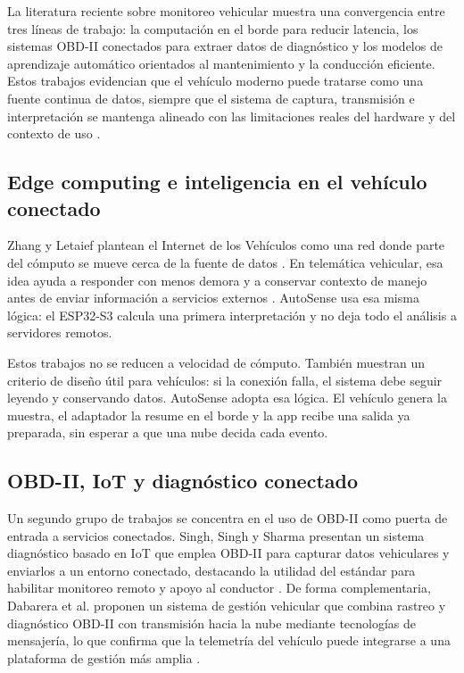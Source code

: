 \documentclass[12pt,letterpaper]{report}
\begin{document}
\label{sec:trabajos-relacionados}

La literatura reciente sobre monitoreo vehicular muestra una convergencia entre tres líneas de trabajo: la computación en el borde para reducir latencia, los sistemas OBD-II conectados para extraer datos de diagnóstico y los modelos de aprendizaje automático orientados al mantenimiento y la conducción eficiente. Estos trabajos evidencian que el vehículo moderno puede tratarse como una fuente continua de datos, siempre que el sistema de captura, transmisión e interpretación se mantenga alineado con las limitaciones reales del hardware y del contexto de uso \cite{zhang2020_iov_edge,selvaraj2023_advanced_telematics,kalalas2025_ai_driven_monitoring}.

\subsection{Edge computing e inteligencia en el vehículo conectado}

Zhang y Letaief plantean el Internet de los Vehículos como una red donde parte del cómputo se mueve cerca de la fuente de datos \cite{zhang2020_iov_edge}. En telemática vehicular, esa idea ayuda a responder con menos demora y a conservar contexto de manejo antes de enviar información a servicios externos \cite{selvaraj2023_advanced_telematics,kalalas2025_ai_driven_monitoring}. AutoSense usa esa misma lógica: el ESP32-S3 calcula una primera interpretación y no deja todo el análisis a servidores remotos.

Estos trabajos no se reducen a velocidad de cómputo. También muestran un criterio de diseño útil para vehículos: si la conexión falla, el sistema debe seguir leyendo y conservando datos. AutoSense adopta esa lógica. El vehículo genera la muestra, el adaptador la resume en el borde y la app recibe una salida ya preparada, sin esperar a que una nube decida cada evento.

\subsection{OBD-II, IoT y diagnóstico conectado}

Un segundo grupo de trabajos se concentra en el uso de OBD-II como puerta de entrada a servicios conectados. Singh, Singh y Sharma presentan un sistema diagnóstico basado en IoT que emplea OBD-II para capturar datos vehiculares y enviarlos a un entorno conectado, destacando la utilidad del estándar para habilitar monitoreo remoto y apoyo al conductor \cite{singh2021_obdii_iot}. De forma complementaria, Dabarera et al. proponen un sistema de gestión vehicular que combina rastreo y diagnóstico OBD-II con transmisión hacia la nube mediante tecnologías de mensajería, lo que confirma que la telemetría del vehículo puede integrarse a una plataforma de gestión más amplia \cite{dabarera2022_iot_vehicle_management}.
\end{document}
